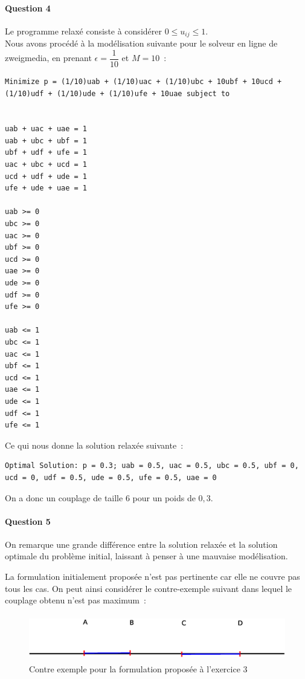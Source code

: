 \paragraph{Question 4}
Le programme relaxé consiste à considérer $0 \leq u_{ij} \leq 1$. \\
Nous avons procédé à la modélisation suivante pour le solveur en ligne
de zweigmedia, en prenant $\epsilon = \dfrac{1}{10}$ et $M=10$~:
\begin{lstlisting}
Minimize p = (1/10)uab + (1/10)uac + (1/10)ubc + 10ubf + 10ucd +
(1/10)udf + (1/10)ude + (1/10)ufe + 10uae subject to


uab + uac + uae = 1 
uab + ubc + ubf = 1 
ubf + udf + ufe = 1 
uac + ubc + ucd = 1 
ucd + udf + ude = 1
ufe + ude + uae = 1 

uab >= 0
ubc >= 0
uac >= 0
ubf >= 0
ucd >= 0
uae >= 0
ude >= 0
udf >= 0
ufe >= 0

uab <= 1
ubc <= 1
uac <= 1
ubf <= 1
ucd <= 1
uae <= 1
ude <= 1
udf <= 1
ufe <= 1
\end{lstlisting}

Ce qui nous donne la solution relaxée suivante~:
\begin{lstlisting}
Optimal Solution: p = 0.3; uab = 0.5, uac = 0.5, ubc = 0.5, ubf = 0,
ucd = 0, udf = 0.5, ude = 0.5, ufe = 0.5, uae = 0
\end{lstlisting}
On a donc un couplage de taille $6$ pour un poids de $0,3$.

\paragraph{Question 5}
On remarque une grande différence entre la solution relaxée et la
solution optimale du problème initial, laissant à penser à une
mauvaise modélisation.


La formulation initialement proposée n'est pas pertinente car elle ne
couvre pas tous les cas. On peut ainsi considérer le contre-exemple
suivant dans lequel le couplage obtenu n'est pas maximum~: 
\begin{figure}[!ht]
\begin{center}
\includegraphics[height=2cm]{exo3.eps}
\end{center}
\caption{Contre exemple pour la formulation proposée à l'exercice 3}
\end{figure}
